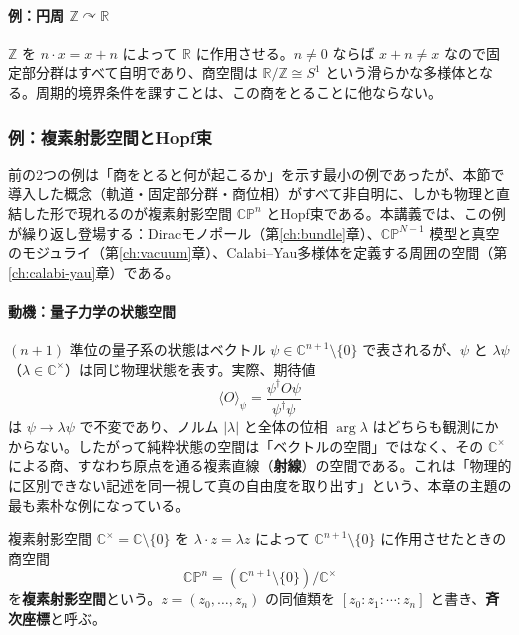 \documentclass[uplatex, dvipdfmx, book]{jsbook}
\let\origsubsubsection\subsubsection
\renewcommand{\subsection}{\origsubsubsection}
\renewcommand{\subsubsection}{\paragraph}
\begin{document}
\paragraph{例：円周 $\mathbb{Z} \curvearrowright \mathbb{R}$}
$\mathbb{Z}$ を $n \cdot x = x + n$ によって $\mathbb{R}$ に作用させる。$n \neq 0$ ならば $x + n \neq x$ なので固定部分群はすべて自明であり、商空間は $\mathbb{R}/\mathbb{Z} \cong S^1$ という滑らかな多様体となる。周期的境界条件を課すことは、この商をとることに他ならない。

\subsection{例：複素射影空間とHopf束}
\label{subsec:cpn-hopf}

前の2つの例は「商をとると何が起こるか」を示す最小の例であったが、本節で導入した概念（軌道・固定部分群・商位相）がすべて非自明に、しかも物理と直結した形で現れるのが複素射影空間 $\mathbb{CP}^n$ とHopf束である。本講義では、この例が繰り返し登場する：Diracモノポール（第\ref{ch:bundle}章）、$\mathbb{CP}^{N-1}$ 模型と真空のモジュライ（第\ref{ch:vacuum}章）、Calabi--Yau多様体を定義する周囲の空間（第\ref{ch:calabi-yau}章）である。

\paragraph{動機：量子力学の状態空間}
$(n+1)$ 準位の量子系の状態はベクトル $\psi \in \mathbb{C}^{n+1} \setminus \{0\}$ で表されるが、$\psi$ と $\lambda \psi$（$\lambda \in \mathbb{C}^\times$）は同じ物理状態を表す。実際、期待値
\begin{equation}
    \langle O \rangle_\psi = \frac{\psi^\dagger O \psi}{\psi^\dagger \psi}
\end{equation}
は $\psi \to \lambda\psi$ で不変であり、ノルム $|\lambda|$ と全体の位相 $\arg\lambda$ はどちらも観測にかからない。したがって純粋状態の空間は「ベクトルの空間」ではなく、その $\mathbb{C}^\times$ による商、すなわち原点を通る複素直線（\textbf{射線}）の空間である。これは「物理的に区別できない記述を同一視して真の自由度を取り出す」という、本章の主題の最も素朴な例になっている。

\begin{mydef}{複素射影空間}{}
$\mathbb{C}^\times = \mathbb{C} \setminus \{0\}$ を $\lambda \cdot z = \lambda z$ によって $\mathbb{C}^{n+1} \setminus \{0\}$ に作用させたときの商空間
\begin{equation*}
    \mathbb{CP}^n = (\mathbb{C}^{n+1} \setminus \{0\}) / \mathbb{C}^\times
\end{equation*}
を\textbf{複素射影空間}という。$z = (z_0, \dots, z_n)$ の同値類を $[z_0 : z_1 : \cdots : z_n]$ と書き、\textbf{斉次座標}と呼ぶ。
\end{mydef}
\end{document}
